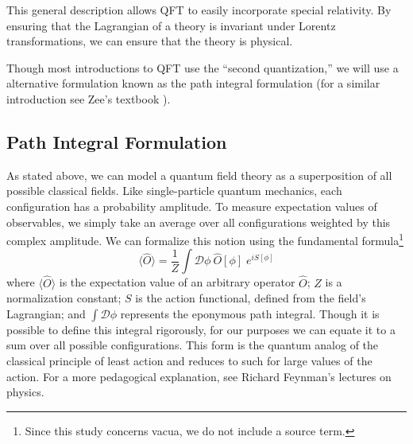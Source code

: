 \documentclass[12pt]{report}
\begin{document}
This general description allows QFT to easily incorporate special relativity. By ensuring that the Lagrangian of a theory is invariant under Lorentz transformations, we can ensure that the theory is physical. %

Though most introductions to QFT use the ``second quantization,'' we will use a alternative formulation known as the path integral formulation (for a similar introduction see Zee's textbook \cite{zee2010}).
 
\subsection{Path Integral Formulation}
\label{sec:pathintegral}

As stated above, we can model a quantum field theory as a superposition of all possible classical fields. Like single-particle quantum mechanics, each configuration has a probability amplitude. To measure expectation values of observables, we simply take an average over all configurations weighted by this complex amplitude. We can formalize this notion using the fundamental formula\footnote{Since this study concerns vacua, we do not include a source term.}
\begin{equation}
    \label{eq:pathintegral}
    \langle \hat O \rangle = \frac{1}{Z} \int \mathcal{D}\phi \: \hat O [\phi]\; e^{iS[\phi]}
\end{equation}
where $\langle \hat O \rangle$ is the expectation value of an arbitrary operator $\hat O$; $Z$ is a normalization constant; $S$ is the action functional, defined from the field's Lagrangian; and $\int \mathcal{D}\phi$ represents the eponymous path integral. Though it is possible to define this integral rigorously, for our purposes we can equate it to a sum over all possible configurations. This form is the quantum analog of the classical principle of least action and reduces to such for large values of the action. For a more pedagogical explanation, see Richard Feynman's lectures on physics.\cite{feynman1963a}
\end{document}
